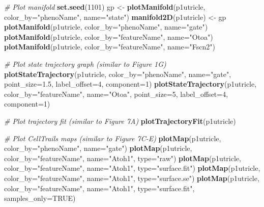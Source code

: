 \documentclass[]{book}
\newenvironment{Shaded}{\begin{snugshade}}{\end{snugshade}}
\newcommand{\KeywordTok}[1]{\textcolor[rgb]{0.13,0.29,0.53}{\textbf{#1}}}
\newcommand{\DataTypeTok}[1]{\textcolor[rgb]{0.13,0.29,0.53}{#1}}
\newcommand{\DecValTok}[1]{\textcolor[rgb]{0.00,0.00,0.81}{#1}}
\newcommand{\FloatTok}[1]{\textcolor[rgb]{0.00,0.00,0.81}{#1}}
\newcommand{\StringTok}[1]{\textcolor[rgb]{0.31,0.60,0.02}{#1}}
\newcommand{\CommentTok}[1]{\textcolor[rgb]{0.56,0.35,0.01}{\textit{#1}}}
\newcommand{\OtherTok}[1]{\textcolor[rgb]{0.56,0.35,0.01}{#1}}
\newcommand{\NormalTok}[1]{#1}
\theoremstyle{definition}
\theoremstyle{definition}
\theoremstyle{definition}
\theoremstyle{remark}
\begin{document}
\begin{Shaded}
\begin{Highlighting}[]
{\CommentTok{# Plot manifold}
\KeywordTok{set.seed}\NormalTok{(}\DecValTok{1101}\NormalTok{)}
\NormalTok{gp <-}\StringTok{ }\KeywordTok{plotManifold}\NormalTok{(p1utricle, }\DataTypeTok{color_by=}\StringTok{"phenoName"}\NormalTok{, }\DataTypeTok{name=}\StringTok{"state"}\NormalTok{)}
\KeywordTok{manifold2D}\NormalTok{(p1utricle) <-}\StringTok{ }\NormalTok{gp}
\KeywordTok{plotManifold}\NormalTok{(p1utricle, }\DataTypeTok{color_by=}\StringTok{"phenoName"}\NormalTok{, }\DataTypeTok{name=}\StringTok{"gate"}\NormalTok{)}
\KeywordTok{plotManifold}\NormalTok{(p1utricle, }\DataTypeTok{color_by=}\StringTok{"featureName"}\NormalTok{, }\DataTypeTok{name=}\StringTok{"Otoa"}\NormalTok{)}
\KeywordTok{plotManifold}\NormalTok{(p1utricle, }\DataTypeTok{color_by=}\StringTok{"featureName"}\NormalTok{, }\DataTypeTok{name=}\StringTok{"Fscn2"}\NormalTok{)}

\CommentTok{# Plot state trajectory graph (similar to Figure 1G)}
\KeywordTok{plotStateTrajectory}\NormalTok{(p1utricle, }\DataTypeTok{color_by=}\StringTok{"phenoName"}\NormalTok{, }
                    \DataTypeTok{name=}\StringTok{"gate"}\NormalTok{, }\DataTypeTok{point_size=}\FloatTok{1.5}\NormalTok{, }
                    \DataTypeTok{label_offset=}\DecValTok{4}\NormalTok{, }\DataTypeTok{component=}\DecValTok{1}\NormalTok{)}
\KeywordTok{plotStateTrajectory}\NormalTok{(p1utricle, }\DataTypeTok{color_by=}\StringTok{"featureName"}\NormalTok{, }
                    \DataTypeTok{name=}\StringTok{"Otoa"}\NormalTok{, }\DataTypeTok{point_size=}\DecValTok{5}\NormalTok{, }
                    \DataTypeTok{label_offset=}\DecValTok{4}\NormalTok{, }\DataTypeTok{component=}\DecValTok{1}\NormalTok{)}

\CommentTok{# Plot trajectory fit (similar to Figure 7A)}
\KeywordTok{plotTrajectoryFit}\NormalTok{(p1utricle)}

\CommentTok{# Plot CellTrails maps (similar to Figure 7C-E)}
\KeywordTok{plotMap}\NormalTok{(p1utricle, }\DataTypeTok{color_by=}\StringTok{"phenoName"}\NormalTok{, }\DataTypeTok{name=}\StringTok{"gate"}\NormalTok{)}
\KeywordTok{plotMap}\NormalTok{(p1utricle, }\DataTypeTok{color_by=}\StringTok{"featureName"}\NormalTok{, }
        \DataTypeTok{name=}\StringTok{"Atoh1"}\NormalTok{, }\DataTypeTok{type=}\StringTok{"raw"}\NormalTok{)}
\KeywordTok{plotMap}\NormalTok{(p1utricle, }\DataTypeTok{color_by=}\StringTok{"featureName"}\NormalTok{, }
        \DataTypeTok{name=}\StringTok{"Atoh1"}\NormalTok{, }\DataTypeTok{type=}\StringTok{"surface.fit"}\NormalTok{)}
\KeywordTok{plotMap}\NormalTok{(p1utricle, }\DataTypeTok{color_by=}\StringTok{"featureName"}\NormalTok{, }
        \DataTypeTok{name=}\StringTok{"Atoh1"}\NormalTok{, }\DataTypeTok{type=}\StringTok{"surface.se"}\NormalTok{)}
\KeywordTok{plotMap}\NormalTok{(p1utricle, }\DataTypeTok{color_by=}\StringTok{"featureName"}\NormalTok{, }
        \DataTypeTok{name=}\StringTok{"Atoh1"}\NormalTok{, }\DataTypeTok{type=}\StringTok{"surface.fit"}\NormalTok{, }
        \DataTypeTok{samples_only=}\OtherTok{TRUE}\NormalTok{)}

}
\end{Highlighting}
\end{Shaded}
\end{document}
